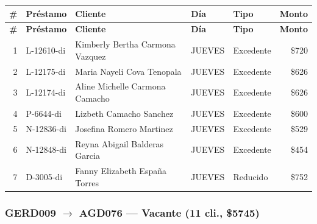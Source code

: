 \documentclass[11pt,a4paper]{article}
\newcommand{\money}[1]{\$\num{#1}}
\begin{document}
\begin{center}
\renewcommand{\arraystretch}{1.1}
\footnotesize
\begin{longtable}{rlp{5.5cm}llr}
\toprule
\textbf{\#} & \textbf{Pr\'estamo} & \textbf{Cliente} & \textbf{D\'ia} & \textbf{Tipo} & \textbf{Monto} \\
\midrule
\endfirsthead
\toprule
\textbf{\#} & \textbf{Pr\'estamo} & \textbf{Cliente} & \textbf{D\'ia} & \textbf{Tipo} & \textbf{Monto} \\
\midrule
\endhead
1 & L-12610-di & Kimberly Bertha Carmona Vazquez & JUEVES & Excedente & \money{720} \\
2 & L-12175-di & Maria Nayeli Cova Tenopala & JUEVES & Excedente & \money{626} \\
3 & L-12174-di & Aline Michelle Carmona Camacho & JUEVES & Excedente & \money{626} \\
4 & P-6644-di & Lizbeth Camacho Sanchez & JUEVES & Excedente & \money{600} \\
5 & N-12836-di & Josefina Romero Martinez & JUEVES & Excedente & \money{529} \\
6 & N-12848-di & Reyna Abigail Balderas Garcia & JUEVES & Excedente & \money{454} \\
7 & D-3005-di & Fanny Elizabeth España Torres & JUEVES & Reducido & \money{752} \\

\bottomrule
\end{longtable}
\end{center}
\subsubsection{GERD009 $\rightarrow$ AGD076 --- Vacante (11 cli., \money{5745})}
\end{document}
